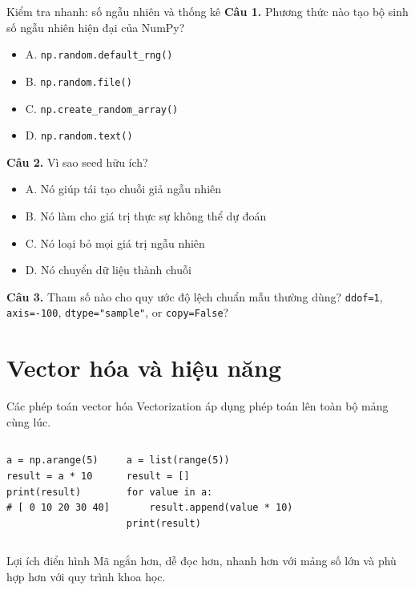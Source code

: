 \documentclass[aspectratio=169,11pt]{beamer}
\newcommand{\quiztitle}[1]{\textbf{\textcolor{QuizOrange}{#1}}}
\begin{document}
\begin{frame}{Kiểm tra nhanh: số ngẫu nhiên và thống kê}
\small
\quiztitle{Câu 1.} Phương thức nào tạo bộ sinh số ngẫu nhiên hiện đại của NumPy?
\begin{itemize}
  \item A. \texttt{np.random.default\_rng()}
  \item B. \texttt{np.random.file()}
  \item C. \texttt{np.create\_random\_array()}
  \item D. \texttt{np.random.text()}
\end{itemize}
\quiztitle{Câu 2.} Vì sao seed hữu ích?
\begin{itemize}
  \item A. Nó giúp tái tạo chuỗi giả ngẫu nhiên
  \item B. Nó làm cho giá trị thực sự không thể dự đoán
  \item C. Nó loại bỏ mọi giá trị ngẫu nhiên
  \item D. Nó chuyển dữ liệu thành chuỗi
\end{itemize}
\quiztitle{Câu 3.} Tham số nào cho quy ước độ lệch chuẩn mẫu thường dùng? \texttt{ddof=1}, \texttt{axis=-100}, \texttt{dtype="sample"}, or \texttt{copy=False}?
\end{frame}

\section{Vector hóa và hiệu năng}

\begin{frame}[fragile]{Các phép toán vector hóa}
\small
Vectorization áp dụng phép toán lên toàn bộ mảng cùng lúc.
\begin{columns}[T]
\begin{lstlisting}[style=py]
a = np.arange(5)
result = a * 10
print(result)
# [ 0 10 20 30 40]
\end{lstlisting}
\begin{lstlisting}[style=py]
a = list(range(5))
result = []
for value in a:
    result.append(value * 10)
print(result)
\end{lstlisting}
\end{columns}
\begin{block}{Lợi ích điển hình}
Mã ngắn hơn, dễ đọc hơn, nhanh hơn với mảng số lớn và phù hợp hơn với quy trình khoa học.
\end{block}
\end{frame}
\end{document}
